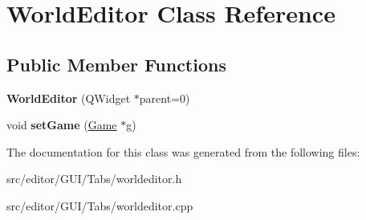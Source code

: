\hypertarget{class_world_editor}{\section{\-World\-Editor \-Class \-Reference}
\label{class_world_editor}
}
\subsection*{\-Public \-Member \-Functions}
\begin{DoxyCompactItemize}
\item 
\hypertarget{class_world_editor_a92603770ba42ee0fe5e28e28c7ff8ac4}{{\bfseries \-World\-Editor} (\-Q\-Widget $\ast$parent=0)}\label{class_world_editor_a92603770ba42ee0fe5e28e28c7ff8ac4}

\item 
\hypertarget{class_world_editor_a673feffa8f6fb325ed4cea23c6f340ae}{void {\bfseries set\-Game} (\hyperlink{class_game}{\-Game} $\ast$g)}\label{class_world_editor_a673feffa8f6fb325ed4cea23c6f340ae}

\end{DoxyCompactItemize}


\-The documentation for this class was generated from the following files\-:\begin{DoxyCompactItemize}
\item 
src/editor/\-G\-U\-I/\-Tabs/worldeditor.\-h\item 
src/editor/\-G\-U\-I/\-Tabs/worldeditor.\-cpp\end{DoxyCompactItemize}
